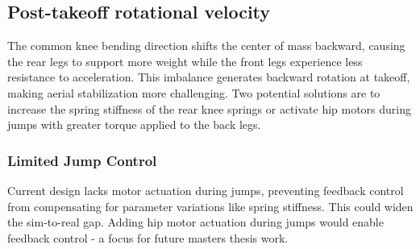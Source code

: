 \subsection{Post-takeoff rotational velocity}
The common knee bending direction shifts the center of mass backward, causing the rear legs to support more weight while the front legs 
experience less resistance to acceleration. This imbalance generates backward rotation at takeoff, making aerial stabilization more 
challenging. Two potential solutions are to increase the spring stiffness of the rear knee springs or activate hip motors during jumps with greater torque applied to the back legs.


\subsubsection{Limited Jump Control}
Current design lacks motor actuation during jumps, preventing feedback control from compensating for parameter variations like spring stiffness. This could widen the sim-to-real gap. Adding hip motor actuation during jumps would enable feedback control - a focus for future masters thesis work.


